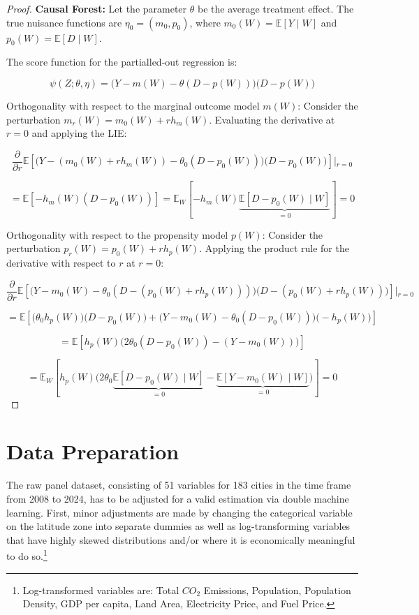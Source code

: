 \documentclass[12pt, a4paper]{article}
\begin{document}
\begin{proof}\label{proof:Neyman_causal_forest}
\textbf{Causal Forest: } Let the parameter $\theta$ be the average treatment effect. The true nuisance functions are $\eta_0 = (m_0, p_0)$, where $m_0(W) = \mathbb{E}[Y \mid W]$ and $p_0(W) = \mathbb{E}[D \mid W]$.

The score function for the partialled-out regression is:


$$\psi(Z; \theta, \eta) = \Big(Y - m(W) - \theta(D - p(W))\Big)\Big(D - p(W)\Big)$$

Orthogonality with respect to the marginal outcome model $m(W)$:
Consider the perturbation $m_r(W) = m_0(W) + r h_m(W)$. Evaluating the derivative at $r=0$ and applying the LIE:


$$\frac{\partial}{\partial r} \mathbb{E}\left[ \Big(Y - (m_0(W) + r h_m(W)) - \theta_0(D - p_0(W))\Big)\Big(D - p_0(W)\Big) \right] \Bigg\vert{}_{r=0}$$

$$= \mathbb{E}\left[ -h_m(W)(D - p_0(W)) \right] = \mathbb{E}_W\left[ -h_m(W) \underbrace{\mathbb{E}[D - p_0(W) \mid W]}_{=0} \right] = 0$$

Orthogonality with respect to the propensity model $p(W)$:
Consider the perturbation $p_r(W) = p_0(W) + r h_p(W)$. Applying the product rule for the derivative with respect to $r$ at $r=0$:


$$\frac{\partial}{\partial r} \mathbb{E}\left[ \Big(Y - m_0(W) - \theta_0(D - (p_0(W) + r h_p(W)))\Big)\Big(D - (p_0(W) + r h_p(W))\Big) \right] \Bigg\vert{}_{r=0}$$

$$= \mathbb{E}\left[ \Big(\theta_0 h_p(W)\Big)\Big(D - p_0(W)\Big) + \Big(Y - m_0(W) - \theta_0(D - p_0(W))\Big)\Big(-h_p(W)\Big) \right]$$

$$= \mathbb{E}\left[ h_p(W) \Big( 2\theta_0(D - p_0(W)) - (Y - m_0(W)) \Big) \right]$$

$$= \mathbb{E}_W\left[ h_p(W) \Big( 2\theta_0 \underbrace{\mathbb{E}[D - p_0(W) \mid W]}_{=0} - \underbrace{\mathbb{E}[Y - m_0(W) \mid W]}_{=0} \Big) \right] = 0$$


\end{proof}

\section{Data Preparation}
\label{sec:data_preparation}

The raw panel dataset, consisting of 51 variables for 183 cities in the time frame from 2008 to 2024, has to be adjusted for a valid estimation via double machine learning. First, minor adjustments are made by changing the categorical variable on the latitude zone into separate dummies as well as log-transforming variables that have highly skewed distributions and/or where it is economically meaningful to do so.\footnote{Log-transformed variables are: Total $CO_2$ Emissions, Population, Population Density, GDP per capita, Land Area, Electricity Price, and Fuel Price.}
\end{document}
